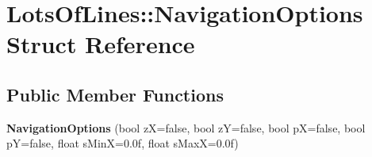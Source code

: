 \hypertarget{struct_lots_of_lines_1_1_navigation_options}{}\section{Lots\+Of\+Lines\+:\+:Navigation\+Options Struct Reference}
\label{struct_lots_of_lines_1_1_navigation_options}
\subsection*{Public Member Functions}
\begin{DoxyCompactItemize}
\item 
{\bfseries Navigation\+Options} (bool zX=false, bool zY=false, bool pX=false, bool pY=false, float s\+MinX=0.\+0f, float s\+Max\+X=0.\+0f)\hypertarget{struct_lots_of_lines_1_1_navigation_options_aa4123e1c1e33ce2c1dfc1a2c9d1fcf85}{}\label{struct_lots_of_lines_1_1_navigation_options_aa4123e1c1e33ce2c1dfc1a2c9d1fcf85}

\end{DoxyCompactItemize}
